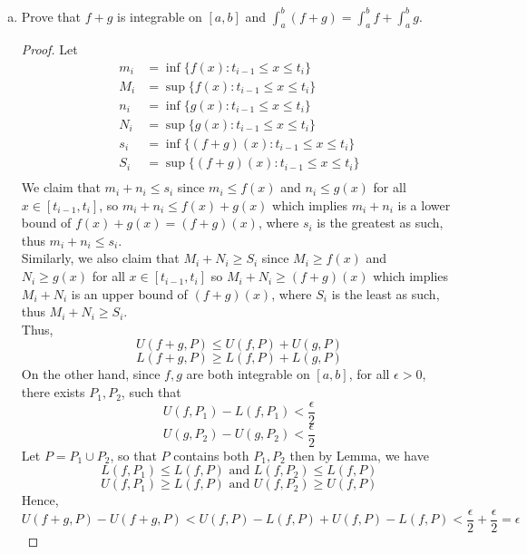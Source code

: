 \documentclass[10pt,letterpaper]{article}
\begin{document}
\begin{enumerate}[(a)]
		\item Prove that $f + g$ is integrable on $[a, b]$ and 
		$\displaystyle\int_{a}^{b} (f + g) = \displaystyle\int_{a}^{b} f + 
		\displaystyle\int_{a}^{b} g$.
		\begin{proof}
		Let 
		\begin{align*}
 			m_i &= \inf\{f(x) : t_{i-1} \leq x \leq t_i\} \\
			M_i &= \sup\{f(x) : t_{i-1} \leq x \leq t_i\} \\
			n_i &= \inf\{g(x) : t_{i-1} \leq x \leq t_i\} \\
			N_i &= \sup\{g(x) : t_{i-1} \leq x \leq t_i\} \\
			s_i &= \inf\{(f + g)(x) : t_{i-1} \leq x \leq t_i\} \\
			S_i &= \sup\{(f + g)(x) : t_{i-1} \leq x \leq t_i\} \\
		\end{align*}
		We claim that $m_i + n_i \leq s_i$ since $m_i \leq f(x)$ and $n_i \leq g(x)$ for all $x \in [t_{i-1}, t_i]$, so 
		$m_i + n_i \leq f(x) + g(x)$ which implies $m_i + n_i$ is a lower bound of $f(x) + g(x) = (f + g)(x)$, where
		$s_i$ is the greatest as such, thus $m_i + n_i \leq s_i$. \\
		Similarly, we also claim that $M_i + N_i \geq S_i$ since $M_i \geq f(x)$ and $N_i \geq g(x)$ for all $x \in [t_{i-1}, t_i]$
		so $M_i + N_i \geq (f + g)(x)$ which implies $M_i + N_i$ is an upper bound of $(f + g)(x)$, where $S_i$ is the least 
		as such, thus $M_i + N_i \geq S_i$. \\
		Thus, 
		$$U(f + g, P) \leq U(f, P) + U(g, P)$$
		$$L(f + g, P) \geq L(f, P) + L(g, P)$$
		On the other hand, since $f, g$ are both integrable on $[a, b]$, for all $\epsilon > 0$, there exists $P_1, P_2$, such that
		$$U(f, P_1) - L(f, P_1) < \dfrac{\epsilon}{2}$$
		$$U(g, P_2) - U(g, P_2) < \dfrac{\epsilon}{2}$$
		Let $P = P_1 \cup P_2$, so that $P$ contains both $P_1, P_2$ then by Lemma, we have
		$$L(f, P_1) \leq L(f, P) \text{ and } L(f, P_2) \leq L(f, P)$$
		$$U(f, P_1) \geq L(f, P) \text{ and } U(f, P_2) \geq U(f, P)$$ 
		Hence,
		$$U(f + g, P) - U(f + g, P) < U(f, P) - L(f, P) + U(f, P) - L(f, P) < \dfrac{\epsilon}{2} + \dfrac{\epsilon}{2} = \epsilon$$
		\end{proof}
	\end{enumerate}
	
\end{document}
